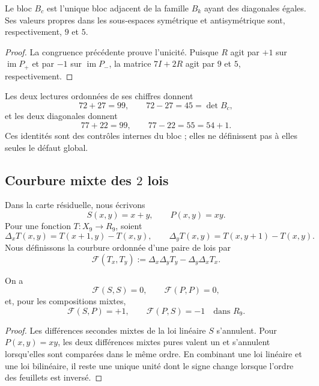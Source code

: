 \begin{theorem}
\label{p12-83-c1-s1:thm:app-bloque-central}
Le bloc \(B_c\) est l’unique bloc adjacent de la famille \(B_k\) ayant
des diagonales égales. Ses valeurs propres dans les sous-espaces symétrique et
antisymétrique sont, respectivement, \(9\) et \(5\).
\end{theorem}

\begin{proof}
La congruence précédente prouve l’unicité. Puisque \(R\) agit par
\(+1\) sur \(\operatorname{im}P_+\) et par \(-1\) sur
\(\operatorname{im}P_-\), la matrice \(7I+2R\) agit par \(9\) et \(5\),
respectivement.
\end{proof}

Les deux lectures ordonnées de ses chiffres donnent
\[
 72+27=99,
 \qquad
 72-27=45=\det B_c,
\]
et les deux diagonales donnent
\[
 77+22=99,
 \qquad
 77-22=55=54+1.
\]
Ces identités sont des contrôles internes du bloc ; elles ne définissent pas à elles seules
le défaut global.

\subsection{Courbure mixte des \(2\) lois}

Dans la carte résiduelle, nous écrivons
\[
 S(x,y)=x+y,
 \qquad
 P(x,y)=xy.
\]
Pour une fonction \(T:X_9\to R_9\), soient
\[
 \Delta_xT(x,y)=T(x+1,y)-T(x,y),
 \qquad
 \Delta_yT(x,y)=T(x,y+1)-T(x,y).
\]
Nous définissons la courbure ordonnée d’une paire de lois par
\[
 \mathcal F(T_x,T_y)
 :=\Delta_x\Delta_yT_y-\Delta_y\Delta_xT_x.
\]

\begin{proposition}
\label{p12-83-c1-s1:prop:app-curvatura-mixta}
On a
\[
 \mathcal F(S,S)=0,
 \qquad
 \mathcal F(P,P)=0,
\]
et, pour les compositions mixtes,
\[
 \mathcal F(S,P)=+1,
 \qquad
 \mathcal F(P,S)=-1
 \quad\text{dans }R_9.
\]
\end{proposition}

\begin{proof}
Les différences secondes mixtes de la loi linéaire \(S\) s’annulent. Pour
\(P(x,y)=xy\), les deux différences mixtes pures valent un et s’annulent lorsqu’elles sont
comparées dans le même ordre. En combinant une loi linéaire et une loi bilinéaire,
il reste une unique unité dont le signe change lorsque l’ordre des feuillets est inversé.
\end{proof}

